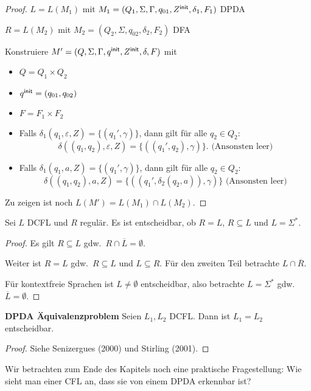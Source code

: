 {\begin{proof}
    $L = L (M_1)$ mit $M_1 = (Q_1, \Sigma, \Gamma, q_{01}, Z^\mathsf{init},
    \delta_1, F_1)$ \ac{DPDA}

    $R = L (M_2)$ mit $M_2 = (Q_2, \Sigma, q_{02}, \delta_2, F_2)$
    \ac{DFA}

    Konstruiere $M'= (Q, \Sigma, \Gamma, q^\mathsf{init}, Z^\mathsf{init}, \delta, F)$ mit
    \begin{itemize}
    \item $Q = Q_1 \times Q_2$
    \item $q^\mathsf{init} = (q_{01}, q_{02})$
    \item $F = F_1  \times F_2$
    \item Falls $\delta_1 (q_1, \varepsilon, Z) = \{(q_1', \gamma)\}$, dann gilt für alle $q_2\in Q_2$: 
      \[ \delta ((q_1, q_2), \varepsilon, Z)
      = \{((q_1', q_2), \gamma)\} \text{.     (Ansonsten leer)} \]
    \item Falls $\delta_1 (q_1, a, Z) = \{(q_1', \gamma)\}$, dann gilt für alle $q_2\in Q_2$: 
      \[ \delta ((q_1, q_2), a, Z) =
      \{((q_1', \delta_2 (q_2, a)), \gamma)\} \text{   (Ansonsten leer)} \]
    \end{itemize}
    Zu zeigen ist noch $L (M') = L (M_1) \cap L (M_2)$.
\end{proof}
\begin{Satz}
    Sei $L$ DCFL und $R$ regulär.
    Es ist entscheidbar, ob $R=L$, $R\subseteq L$ und $L=\Sigma^*$.
\end{Satz}
\begin{proof}
    Es gilt $R\subseteq L$ gdw.\ $R \cap \overline{L} = \emptyset$.
    
    Weiter ist $R = L$ gdw.\ $R\subseteq L$ und $L \subseteq R$. Für den zweiten Teil betrachte $L\cap \overline{R}$.
    
    Für kontextfreie Sprachen ist $L\ne \emptyset$ entscheidbar, also betrachte $L=\Sigma^*$ gdw.\ $\overline{L}=\emptyset$.
\end{proof}

\begin{Satz} \textbf{DPDA Äquivalenzproblem}
    Seien $L_1, L_2$ DCFL. Dann ist $L_1 = L_2$ entscheidbar.
\end{Satz}

\begin{proof}
    Siehe Senizergues (2000) und Stirling (2001).
\end{proof}

Wir betrachten zum Ende des Kapitels noch eine praktische Fragestellung: Wie sieht man einer CFL an, dass sie von einem DPDA erkennbar ist?

}
